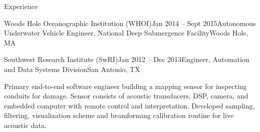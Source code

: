 \documentclass{resume} %
\begin{document}
\begin{rSection}{Experience}
\begin{rSubsection}{Woods Hole Oceanographic Institution (WHOI)}{Jan 2014 -- Sept 2015}{Autonomous Underwater Vehicle Engineer, National Deep Submergence Facility}{Woods Hole, MA}
\end{rSubsection}
	\vspace{-.2cm}
\begin{rSubsection}{Southwest Research Institute (SwRI)}{Jan 2012 -- Dec 2013}{Engineer, Automation and Data Systems Division}{San Antonio, TX}{}
\item{Primary end-to-end software engineer building a mapping sensor for inspecting conduits for damage. Sensor consists of acoustic transducers, DSP, camera, and embedded computer with remote control and interpretation. Developed sampling, filtering, visualization scheme and beamforming calibration routine for live acoustic data.}
\end{rSubsection}
\end{rSection}
	\vspace{-.5cm}
% 
\end{document}
